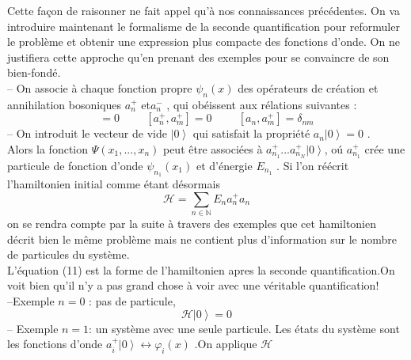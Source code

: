 \documentclass[12pt,a4paper, openany]{article}
\begin{document}
\hspace{0.3cm}Cette façon de raisonner ne fait appel qu’à nos connaissances précédentes. On va introduire maintenant le formalisme de la seconde quantiﬁcation pour reformuler le problème et obtenir une expression plus compacte des fonctions d’onde. On ne justiﬁera cette approche qu’en prenant des exemples pour se convaincre de son bien-fondé.\\
 – On associe à chaque fonction propre ${\psi}_n(x) $ des opérateurs de création et annihilation bosoniques $a^{+}_n$ et$a^{-}_n$ , qui obéissent aux rélations suivantes :
\begin{equation}
		[a_n,a_m]=0 \hspace{1cm} [a^{+}_n,a^{+}_m]=0 \hspace{1cm}[a_n,a^{+}_m]=\delta_{nm}
\end{equation}
– On introduit le vecteur de vide $\left|0\right\rangle$ qui satisfait la propriété $a_n\left|0\right\rangle=0$ .\\
Alors la fonction $\Psi(x_1,...,x_n)$ peut \^{e}tre associées à $a^{+}_{n_1}...a^{+}_{n_N}\left|0\right\rangle$, o\'{u} $a^{+}_{n_1}$ crée une particule de fonction d'onde ${\psi}_{n_1}(x_1)$ et d'énergie $E_{n_1}$ .
Si l’on réécrit l’hamiltonien initial comme étant désormais 
\begin{equation}
	\mathcal{H}=\sum_{n\in\mathbb{N}}E_na^{+}_na_n
\end{equation}
on se rendra compte par la suite à travers des exemples que cet hamiltonien décrit bien le même problème mais ne contient plus d’information sur le nombre de particules du système.\\
L'équation (11) est la forme de l'hamiltonien apres la seconde quantification.On voit bien qu'il n'y a pas grand chose à voir avec une véritable quantification! \\
–Exemple $n=0$ : pas de particule,
\begin{equation}
	\mathcal{H}\left|0\right\rangle=0
\end{equation}
– Exemple $n=1$: un système avec une seule particule. Les états du système sont les fonctions d’onde $a_i^{+}\left|0\right\rangle\leftrightarrow{\varphi_i}(x)$ .On applique $\mathcal{H}$
\end{document}
